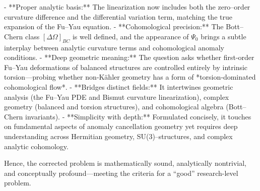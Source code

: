 - **Proper analytic basis:** The linearization now includes both the zero–order curvature difference and the differential variation term, matching the true expansion of the Fu–Yau equation.  
- **Cohomological precision:** The Bott–Chern class \([\Delta\Omega]_{BC}\) is well defined, and the appearance of \(\Psi_0\) brings a subtle interplay between analytic curvature terms and cohomological anomaly conditions.  
- **Deep geometric meaning:** The question asks whether first-order Fu–Yau deformations of balanced structures are controlled entirely by intrinsic torsion—probing whether non‑Kähler geometry has a form of *torsion‑dominated cohomological flow*.  
- **Bridges distinct fields:** It intertwines geometric analysis (the Fu–Yau PDE and Bismut curvature linearization), complex geometry (balanced and torsion structures), and cohomological algebra (Bott–Chern invariants).  
- **Simplicity with depth:** Formulated concisely, it touches on fundamental aspects of anomaly cancellation geometry yet requires deep understanding across Hermitian geometry, SU(3)–structures, and complex analytic cohomology.

Hence, the corrected problem is mathematically sound, analytically nontrivial, and conceptually profound—meeting the criteria for a “good” research-level problem.